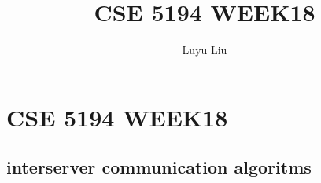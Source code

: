 \documentclass[12pt]{article}
\begin{document}
\author{Luyu Liu}

\newcommand\para{\par\refstepcounter{para}\thepara\space}

\section*{CSE 5194 WEEK18}
\title{CSE 5194 WEEK18}

\subsection{interserver communication algoritms}
\end{document}
